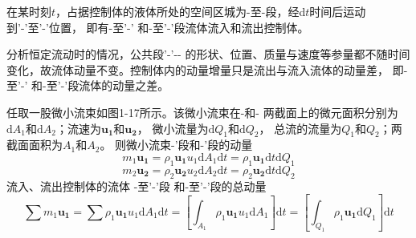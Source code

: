 在某时刻$t$，占据控制体的液体所处的空间区城为\uppercase\expandafter{}-\uppercase\expandafter{}至\uppercase\expandafter{}-\uppercase\expandafter{}段，经d$t$时间后运动
到\uppercase\expandafter{}'-\uppercase\expandafter{}'至\uppercase\expandafter{}'-\uppercase\expandafter{}'位置，
即有\uppercase\expandafter{}-\uppercase\expandafter{}至\uppercase\expandafter{}'-\uppercase\expandafter{}'
和\uppercase\expandafter{}-\uppercase\expandafter{}至\uppercase\expandafter{}'-\uppercase\expandafter{}'段流体流入和流出控制体。

分析恒定流动时的情况，公共段\uppercase\expandafter{}'-\uppercase\expandafter{}'-\uppercase\expandafter{}-\uppercase\expandafter{}
的形状、位置、质量与速度等参量都不随时间变化，故流体动量不变。控制体内的动量增量只是流出与流入流体的动量差，
即\uppercase\expandafter{}-\uppercase\expandafter{}至\uppercase\expandafter{}'-\uppercase\expandafter{}'
和\uppercase\expandafter{}-\uppercase\expandafter{}至\uppercase\expandafter{}'-\uppercase\expandafter{}'段流体的动量之差。

任取一股微小流束如图1-17所示。该微小流束在\uppercase\expandafter{}-\uppercase\expandafter{}和\uppercase\expandafter{}-\uppercase\expandafter{}
两截面上的微元面积分别为$\mathrm{d}A_1$和$\mathrm{d}A_2$；流速为$\boldsymbol {u_1}$和$\boldsymbol {u_2}$，
微小流量为$\mathrm{d}Q_1$和$\mathrm{d}Q_2$，
总流的流量为$Q_1$和$Q_2$；两截面面积为$A_1$和$A_2$。
则微小流束\uppercase\expandafter{}-\uppercase\expandafter{'}段和\uppercase\expandafter{}-\uppercase\expandafter{}'段的动量
\begin{equation*}
  m_1\boldsymbol{u_1}=\rho_1\boldsymbol{u_1}u_1\mathrm{d}A_1\mathrm{d}t=\rho_1\boldsymbol{u_1}\mathrm{d}t\mathrm{d}Q_1
\end{equation*}
\begin{equation*}
  m_2\boldsymbol{u_2}=\rho_2\boldsymbol{u_2}u_2\mathrm{d}A_2\mathrm{d}t=\rho_2\boldsymbol{u_2}\mathrm{d}t\mathrm{d}Q_2
\end{equation*}
流入、流出控制体的流体
\uppercase\expandafter{}-\uppercase\expandafter{}至\uppercase\expandafter{}'-\uppercase\expandafter{}'段
和\uppercase\expandafter{}-\uppercase\expandafter{}至\uppercase\expandafter{}'-\uppercase\expandafter{}'段的总动量
\begin{equation*}
  \sum{m_1\boldsymbol{u_1}}=\sum\rho_1\boldsymbol{u_1}u_1\mathrm{d}A_1\mathrm{d}t=[\int_{A_1}\rho_1\boldsymbol{u_1}u_1\mathrm{d}A_1]\mathrm{d}t=[\int_{Q_1}\rho_1\boldsymbol{u_1}\mathrm{d}Q_1]\mathrm{d}t
\end{equation*}

